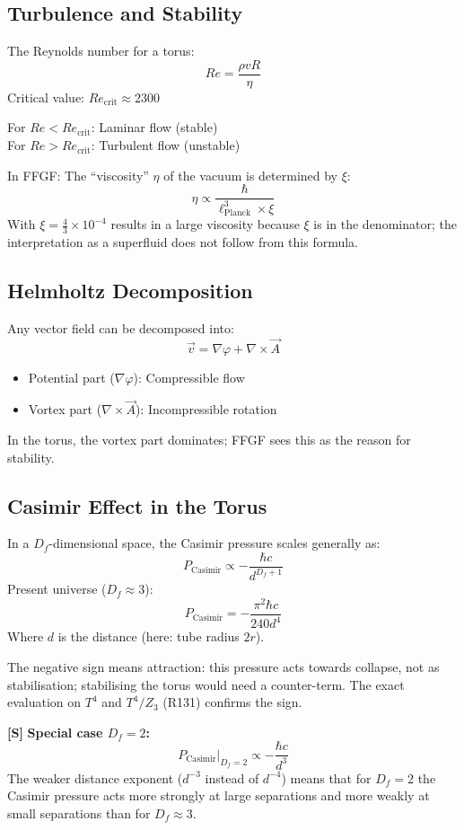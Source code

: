 \subsection{Turbulence and Stability}
The Reynolds number for a torus:
\[
Re = \frac{\rho v R}{\eta}
\]
Critical value: \( Re_{\text{crit}} \approx 2300 \)

For \( Re < Re_{\text{crit}} \): Laminar flow (stable) \\
For \( Re > Re_{\text{crit}} \): Turbulent flow (unstable)

In FFGF:
The ``viscosity'' \( \eta \) of the vacuum is determined by \( \xi \):
\[
\eta \propto \frac{\hbar}{\ell_{\text{Planck}}^3 \times \xi}
\]
With \( \xi = \frac{4}{3} \times 10^{-4} \) results in a large viscosity because $\xi$ is in the denominator; the interpretation as a superfluid does not follow from this formula.

\subsection{Helmholtz Decomposition}
Any vector field can be decomposed into:
\[
\vec{v} = \nabla \varphi + \nabla \times \vec{A}
\]
\begin{itemize}
	\item Potential part (\( \nabla \varphi \)): Compressible flow
	\item Vortex part (\( \nabla \times \vec{A} \)): Incompressible rotation
\end{itemize}

In the torus, the vortex part dominates; FFGF sees this as the reason for stability.

\subsection{Casimir Effect in the Torus}
In a \(D_f\)-dimensional space, the Casimir pressure scales generally as:
\[
P_{\text{Casimir}} \propto -\frac{\hbar c}{d^{D_f+1}}
\]
Present universe (\( D_f \approx 3 \)):
\[
P_{\text{Casimir}} = -\frac{\pi^2 \hbar c}{240 d^4}
\]
Where \( d \) is the distance (here: tube radius \( 2r \)).

The negative sign means attraction: this pressure acts towards collapse, not as stabilisation; stabilising the torus would need a counter-term. The exact evaluation on $T^4$ and $T^4/Z_3$ (R131) confirms the sign.

\textbf{[S]} \textbf{Special case \(D_f = 2\):}
\[
P_{\text{Casimir}}\big|_{D_f=2} \propto -\frac{\hbar c}{d^3}
\]
The weaker distance exponent ($d^{-3}$ instead of $d^{-4}$) means that for $D_f = 2$ the Casimir pressure acts more strongly at large separations and more weakly at small separations than for $D_f \approx 3$.

